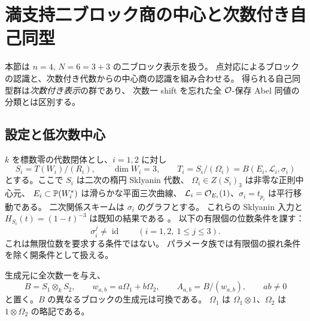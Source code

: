 \section{満支持二ブロック商の中心と次数付き自己同型}
\label{tba:sec:algebra}

本節は $n=4$, $N=6=3+3$ の二ブロック表示を扱う。
点対応によるブロックの認識と、次数付き代数からの中心商の認識を組み合わせる。
得られる自己同型群は\emph{次数付き表示}の群であり、
次数一 shift を忘れた全 $\mathcal O$-保存 Abel 同値の分類とは区別する。

\subsection{設定と低次数中心}

$k$ を標数零の代数閉体とし、$i=1,2$ に対し
\[
 S_i=T(W_i)/(R_i),\qquad \dim W_i=3,
 \qquad T_i=S_i/(\Omega_i)
       =B(E_i,\mathcal L_i,\sigma_i)
\]
とする。ここで $S_i$ は二次の楕円 Sklyanin 代数、
$\Omega_i\in Z(S_i)_3$ は非零な正則中心元、
$E_i\subset\mathbb P(W_i^*)$ は滑らかな平面三次曲線、
$\mathcal L_i=\mathcal O_{E_i}(1)$、$\sigma_i=t_{p_i}$ は平行移動である。
二次関係スキームは $\sigma_i$ のグラフとする。
これらの Sklyanin 入力と
$H_{S_i}(t)=(1-t)^{-3}$ は既知の結果である
\cite[Theorems~6.6, 6.8]{GRSklyaninATV}。
以下の有限個の位数条件を課す：
\begin{equation}\label{tba:eq:finite-order-open}
 \sigma_i^j\ne\operatorname{id}\qquad (i=1,2,\ 1\leq j\leq3).
\end{equation}
これは無限位数を要求する条件ではない。
パラメータ族では有限個の捩れ条件を除く開条件として扱える。

生成元に全次数一を与え、
\begin{equation}\label{tba:eq:two-block-pair}
 B=S_1\otimes_kS_2,
 \qquad w_{a,b}=a\Omega_1+b\Omega_2,
 \qquad A_{a,b}=B/(w_{a,b}),\qquad ab\ne0
\end{equation}
と置く。$B$ の異なるブロックの生成元は可換である。
$\Omega_1$ は $\Omega_1\otimes1$、$\Omega_2$ は
$1\otimes\Omega_2$ の略記である。


